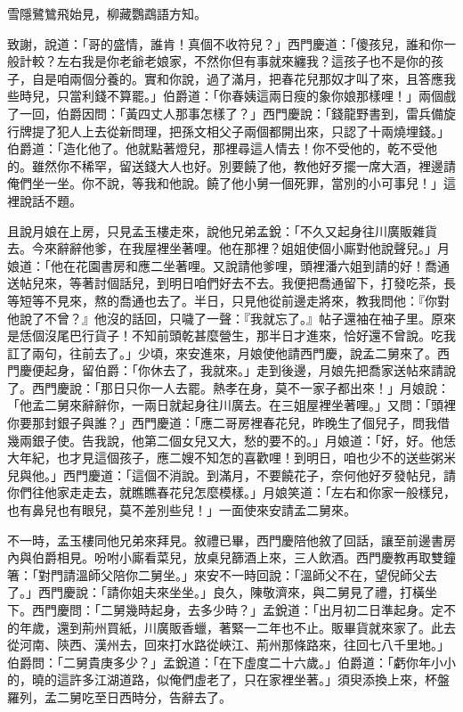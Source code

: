 雪隱鷺鷥飛始見，柳藏鸚鵡語方知。

致謝，說道：「哥的盛情，誰肯！真個不收符兒？」西門慶道：「傻孩兒，誰和你一般計較？左右我是你老爺老娘家，不然你但有事就來纏我？這孩子也不是你的孩子，自是咱兩個分養的。實和你說，過了滿月，把春花兒那奴才叫了來，且答應我些時兒，只當利錢不算罷。」伯爵道：「你春姨這兩日瘦的象你娘那樣哩！」兩個戲了一回，伯爵因問：「黃四丈人那事怎樣了？」西門慶說：「錢龍野書到，雷兵備旋行牌提了犯人上去從新問理，把孫文相父子兩個都開出來，只認了十兩燒埋錢。」伯爵道：「造化他了。他就點著燈兒，那裡尋這人情去！你不受他的，乾不受他的。雖然你不稀罕，留送錢大人也好。別要饒了他，教他好歹擺一席大酒，裡邊請俺們坐一坐。你不說，等我和他說。饒了他小舅一個死罪，當別的小可事兒！」這裡說話不題。

且說月娘在上房，只見孟玉樓走來，說他兄弟孟銳：「不久又起身往川廣販雜貨去。今來辭辭他爹，在我屋裡坐著哩。他在那裡？姐姐使個小廝對他說聲兒。」月娘道：「他在花園書房和應二坐著哩。又說請他爹哩，頭裡潘六姐到請的好！喬通送帖兒來，等著討個話兒，到明日咱們好去不去。我便把喬通留下，打發吃茶，長等短等不見來，熬的喬通也去了。半日，只見他從前邊走將來，教我問他：『你對他說了不曾？』他沒的話回，只噦了一聲：『我就忘了。』帖子還袖在袖子里。原來是恁個沒尾巴行貨子！不知前頭乾甚麼營生，那半日才進來，恰好還不曾說。吃我訌了兩句，往前去了。」少頃，來安進來，月娘使他請西門慶，說孟二舅來了。西門慶便起身，留伯爵：「你休去了，我就來。」走到後邊，月娘先把喬家送帖來請說了。西門慶說：「那日只你一人去罷。熱孝在身，莫不一家子都出來！」月娘說：「他孟二舅來辭辭你，一兩日就起身往川廣去。在三姐屋裡坐著哩。」又問：「頭裡你要那封銀子與誰？」西門慶道：「應二哥房裡春花兒，昨晚生了個兒子，問我借幾兩銀子使。告我說，他第二個女兒又大，愁的要不的。」月娘道：「好，好。他恁大年紀，也才見這個孩子，應二嫂不知怎的喜歡哩！到明日，咱也少不的送些粥米兒與他。」西門慶道：「這個不消說。到滿月，不要饒花子，奈何他好歹發帖兒，請你們往他家走走去，就瞧瞧春花兒怎麼模樣。」月娘笑道：「左右和你家一般樣兒，也有鼻兒也有眼兒，莫不差別些兒！」一面使來安請孟二舅來。

不一時，孟玉樓同他兄弟來拜見。敘禮已畢，西門慶陪他敘了回話，讓至前邊書房內與伯爵相見。吩咐小廝看菜兒，放桌兒篩酒上來，三人飲酒。西門慶教再取雙鐘箸：「對門請溫師父陪你二舅坐。」來安不一時回說：「溫師父不在，望倪師父去了。」西門慶說：「請你姐夫來坐坐。」良久，陳敬濟來，與二舅見了禮，打橫坐下。西門慶問：「二舅幾時起身，去多少時？」孟銳道：「出月初二日準起身。定不的年歲，還到荊州買紙，川廣販香蠟，著緊一二年也不止。販畢貨就來家了。此去從河南、陝西、漢州去，回來打水路從峽江、荊州那條路來，往回七八千里地。」伯爵問：「二舅貴庚多少？」孟銳道：「在下虛度二十六歲。」伯爵道：「虧你年小小的，曉的這許多江湖道路，似俺們虛老了，只在家裡坐著。」須臾添換上來，杯盤羅列，孟二舅吃至日西時分，告辭去了。

